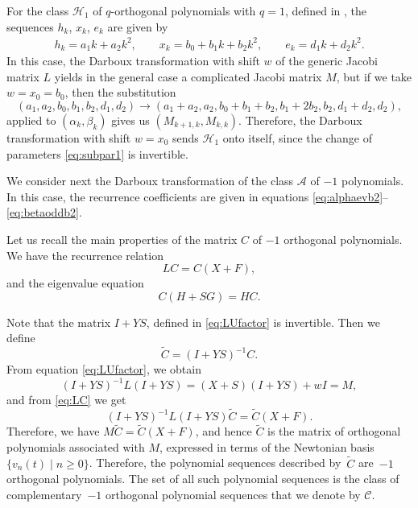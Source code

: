 \documentclass[10pt,a4paper]{amsart}
\def\cA{\mathcal A}
\def\cC{\mathcal C}
\def\cH{\mathcal H}
\numberwithin{equation}{section}
\begin{document}
For the class $\cH_1$ of $q$-orthogonal polynomials with $q=1$, defined in \cite[Section~8]{Uni}, the sequences $h_k$, $x_k$, $e_k$ are given by
\begin{gather*} %
h_k= a_1 k+ a_2 k^2, \qquad
x_k= b_0 + b_1 k + b_2 k^2, \qquad
e_k= d_1 k + d_2 k^2.
\end{gather*}
In this case, the Darboux transformation with shift $w$ of the generic Jacobi matrix $L$ yields in the general case a complicated Jacobi matrix $M$, but if we take $w=x_0=b_0$, then the substitution
\begin{equation}\label{eq:subpar1}
	( a_1,a_2, b_0, b_1, b_2, d_1, d_2)\rightarrow ( a_1+a_2, a_2, b_0+b_1+b_2, b_1+ 2 b_2, b_2, d_1+d_2, d_2),
\end{equation}
applied to $(\alpha_k, \beta_k)$ gives us $(M_{k+1,k}, M_{k,k})$.
Therefore, the Darboux transformation with shift $w=x_0$ sends $\cH_1$ onto itself, since the change of parameters \eqref{eq:subpar1} is invertible.

We consider next the Darboux transformation of the class $\cA$ of $-1$ polynomials. In this case, the recurrence coefficients are given in equations \eqref{eq:alphaevb2}--\eqref{eq:betaoddb2}.

Let us recall the main properties of the matrix $C$ of $-1$ orthogonal polynomials. We have the recurrence relation
\begin{equation}\label{eq:LC}
	LC=C(X+F),
\end{equation}
and the eigenvalue equation
\begin{equation}\label{eq:ChSg}
	C(H+ S G)=H C.
\end{equation}

Note that the matrix $I+YS$, defined in \eqref{eq:LUfactor} is invertible. Then we define
\begin{equation*}%
	\tilde C= (I+ YS)^{-1} C.
\end{equation*}
From equation \eqref{eq:LUfactor}, we obtain
\begin{equation*}
	(I +YS)^{-1} L (I+YS)= (X+S) ( I+YS) + wI=M,
\end{equation*}
and from \eqref{eq:LC} we get
\begin{equation*}
	(I+YS)^{-1} L (I+YS) \tilde C = \tilde C ( X+F).
\end{equation*}
Therefore, we have
$%
M \tilde C= \tilde C (X+F)$,
and hence $\tilde C$ is the matrix of orthogonal polynomials associated with $M$, expressed in terms of the Newtonian basis $\{v_n(t)\mid n \ge 0\}$.
Therefore, the polynomial sequences described by~$\tilde C$ are~$-1$ orthogonal polynomials. The set of all such polynomial sequences is the class of complementary~$-1$ orthogonal polynomial sequences that we denote by $\cC$.
\end{document}
